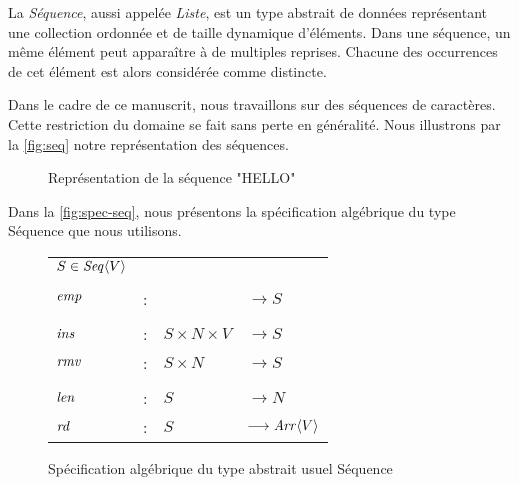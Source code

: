 La \emph{Séquence}, aussi appelée \emph{Liste}, est un type abstrait de données représentant une collection ordonnée et de taille dynamique d'éléments.
Dans une séquence, un même élément peut apparaître à de multiples reprises.
Chacune des occurrences de cet élément est alors considérée comme distincte.

Dans le cadre de ce manuscrit, nous travaillons sur des séquences de caractères.
Cette restriction du domaine se fait sans perte en généralité.
Nous illustrons par la \autoref{fig:seq} notre représentation des séquences.

\begin{figure}[!ht]

  \centering
  \caption{Représentation de la séquence "HELLO"}
  \label{fig:seq}
\end{figure}

Dans la \autoref{fig:spec-seq}, nous présentons la spécification algébrique du type Séquence que nous utilisons.

\begin{figure}[!ht]

  \centering
    \begin{tabular}{llll}
      $S \in \mathit{Seq}\langle V \rangle$ & & & \\
      \\
      $\mathit{emp}$ & : &                       & $\longrightarrow S$   \\
      \\
      $\mathit{ins}$ & : & $S \times N \times V$ & $\longrightarrow S$   \\
      $\mathit{rmv}$ & : & $S \times N$          & $\longrightarrow S$   \\
      \\
      $\mathit{len}$ & : & $S$                   & $\longrightarrow N$   \\
      $\mathit{rd}$  & : & $S$                   & $\longrightarrow \mathit{Arr}\langle V \rangle$ \\
    \end{tabular}
  \caption{Spécification algébrique du type abstrait usuel Séquence}
  \label{fig:spec-seq}
\end{figure}

